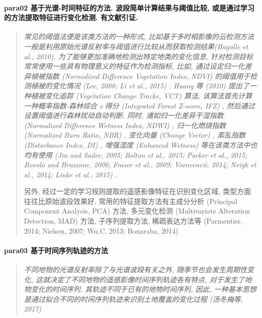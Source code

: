 \paragraph*{para02
    \textcolor[RGB]{17, 205, 29}{基于光谱-时间特征的方法. 波段简单计算结果与阈值比较, 或是通过学习的方法提取特征进行变化检测. 有文献引证.}}
\begin{quotation}
    \itshape
    常见的阈值法便是该类方法的一种形式, 比如基于多时相影像的云检测方法一般是利用原始光谱反射率与阈值进行比较从而获取检测结果(Hagolle et al., 2010). 为了能够更加准确地检测出特定地类的变化信息, 针对检测目标常常使用一些具有物理意义的特征作为检测指标, 比如, 通过设定归一化差异植被指数 (Normalized Difference Vegetation Index, NDVI) 的阈值用于检测植被的变化情况 (Lee, 2008; Li et al., 2015) . Huang 等 (2010) 提出了一种植被变化追踪 (Vegetation Change Tracke, VCT) 算法, 该算法首先计算一种概率指数-森林综合 z 得分 (Integrated Forest Z-score, IFZ) , 然后通过设置阈值进行森林扰动自动判断. 同时, 诸如归一化差异干湿指数 (Normalized Difference Wetness Index,   NDWI) , 归一化燃烧指数 (Normalized Burn Ratio, NBR) , 变化向量 (Change Vector) , 紊乱指数 (Disturbance Index, DI) , 增强湿度 (Enhanced Wetness) 等在该类方法中也均有使用 (Jin and Sader, 2005; Bolton et al., 2015; Parker et al., 2015; Bovolo and Bruzzone, 2006; Fraser et al., 2009; Vorovencii, 2014; Neigh et al., 2014; Linke et al., 2015) . 
    
    另外, 经过一定的学习规则提取的遥感影像特征在识别变化区域, 类型方面往往比原始波段效果好, 常用的特征提取方法有主成分分析 (Principal  Component  Analysis, PCA) 方法, 多元变化检测 (Multivariate Alteration Detection, MAD) 方法, 子序列提取方法, 稀疏表达方法等 (Parmentier, 2014; Nielsen, 2007; Wu.C, 2013; Bouaraba, 2014) 
\end{quotation}

\paragraph*{para03
    \textcolor[RGB]{17, 205, 29}{基于时间序列轨迹的方法}}
\begin{quotation}
    \itshape
    不同地物的光谱反射率除了与光谱波段有关之外, 随季节也会发生周期性变化, 这就决定了不同地物的遥感影像时间序列轨迹各有特点, 对于发生了地物变化的时间序列, 其轨迹不同于已有的地物时间序列, 因此, 一种基本思想是通过拟合不同的时间序列轨迹来识别土地覆盖的变化过程 (汤冬梅等, 2017) 
\end{quotation}

